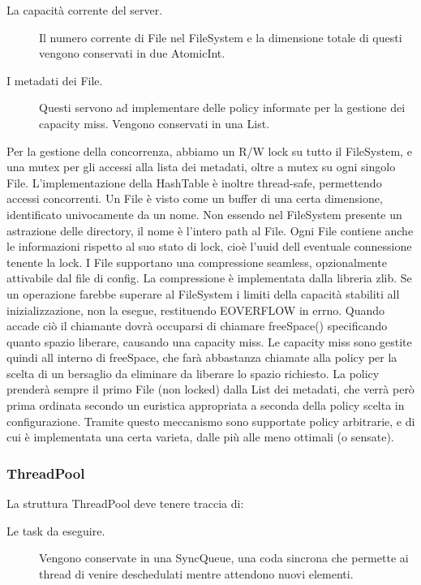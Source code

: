 \documentclass[11pt]{article}
\begin{document}
\begin{flushleft}
\begin{description}
\item[La capacità corrente del server.] Il numero corrente di File nel FileSystem e la dimensione totale di questi vengono conservati in due AtomicInt.

\item[I metadati dei File.] Questi servono ad implementare delle policy informate per la gestione dei capacity miss. Vengono conservati in una List.

\end{description}

Per la gestione della concorrenza, abbiamo un R/W lock su tutto il FileSystem, e una mutex per gli accessi alla lista dei metadati, oltre a mutex su ogni singolo File. L'implementazione della HashTable è inoltre thread-safe, permettendo accessi concorrenti.
Un File è visto come un buffer di una certa dimensione, identificato univocamente da un nome. Non essendo nel FileSystem presente un astrazione delle directory, il nome è l'intero path al File. Ogni File contiene anche le informazioni rispetto al suo stato di lock, cioè l'uuid dell eventuale connessione tenente la lock.
I File supportano una compressione seamless, opzionalmente attivabile dal file di config. La compressione è implementata dalla libreria zlib.
Se un operazione farebbe superare al FileSystem i limiti della capacità stabiliti all inizializzazione, non la esegue, restituendo EOVERFLOW in errno. Quando accade ciò il chiamante dovrà occuparsi di chiamare freeSpace() specificando quanto spazio liberare, causando una capacity miss.
Le capacity miss sono gestite quindi all interno di freeSpace, che farà abbastanza chiamate alla policy per la scelta di un bersaglio da eliminare da liberare lo spazio richiesto. La policy prenderà sempre il primo File (non locked) dalla List dei metadati, che verrà però prima ordinata secondo un euristica appropriata a seconda della policy scelta in configurazione. Tramite questo meccanismo sono supportate policy arbitrarie, e di cui è implementata una certa varieta, dalle più alle meno ottimali (o sensate).

\subsubsection{ThreadPool}

La struttura ThreadPool deve tenere traccia di:
\begin{description}

\item[Le task da eseguire.] Vengono conservate in una SyncQueue, una coda sincrona che permette ai thread di venire deschedulati mentre attendono nuovi elementi.


\end{description}
\end{flushleft}
\end{document}
